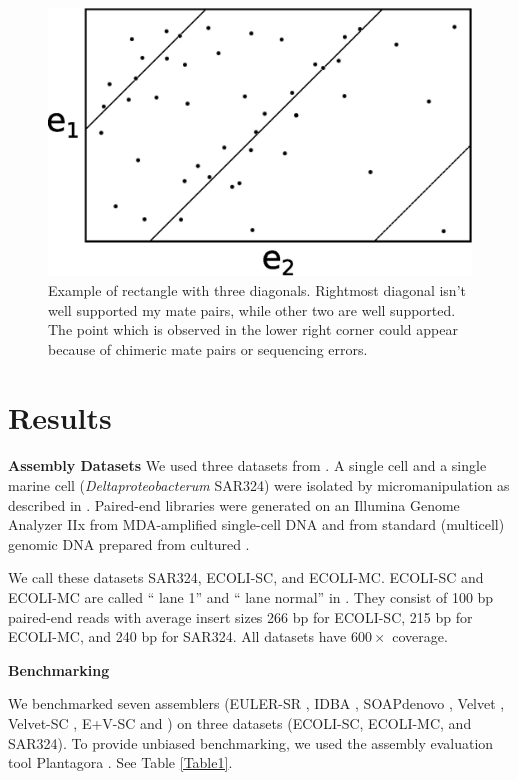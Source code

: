 \begin{figure}
\begin{center}
\includegraphics[scale=0.5]{fig/rectangle.eps}
\caption{Example of rectangle with three diagonals. Rightmost diagonal isn't well supported my mate pairs, while other two are well supported. The point which is observed in the lower right corner could appear because of chimeric mate pairs or sequencing errors.}
\end{center}
\end{figure}


\section{Results}

\textbf{Assembly Datasets}
We used three datasets from \cite{Chitsaz2011}.
A single {\ecoli} cell
and a single marine cell ({\em Deltaproteobacterum} SAR324)
were isolated by micromanipulation as described in \cite{Ishoey2008}.
Paired-end libraries were generated on an Illumina Genome Analyzer IIx from MDA-amplified single-cell DNA
and from standard (multicell) genomic DNA prepared from cultured {\ecoli}.

We call these datasets SAR324, ECOLI-SC, and ECOLI-MC.
ECOLI-SC and ECOLI-MC are called ``{\ecoli} lane 1'' and ``{\ecoli} lane normal'' in \cite{Chitsaz2011}.
They consist of 100 bp paired-end reads
with average insert sizes 266 bp for ECOLI-SC, 215 bp for ECOLI-MC,
and 240 bp for SAR324.
All datasets have $600\times$ coverage.

\textbf{Benchmarking}

We benchmarked seven assemblers
(EULER-SR \cite{Chaisson08}, IDBA \cite{Peng10}, SOAPdenovo \cite{Li10}, Velvet \cite{Zerbino08}, Velvet-SC \cite{Chitsaz2011}, E+V-SC \cite{Chitsaz2011} and {\spades}) on three datasets
(ECOLI-SC, ECOLI-MC, and SAR324). To provide unbiased
benchmarking, we used the assembly evaluation tool Plantagora \cite{Barthelson2011}. See Table \ref{Table1}.


